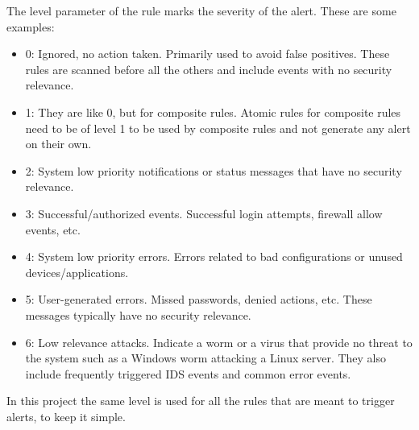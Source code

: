 \linej
The level parameter of the rule marks the severity of the alert. These are some examples\cite{libro_ossec}:
\begin{itemize}
	\item 0: Ignored, no action taken. Primarily used to avoid false positives. These rules are scanned before all the others and include events with no security relevance.
	\item 1: They are like 0, but for composite rules. Atomic rules for composite rules need to be of level 1 to be used by composite rules and not generate any alert on their own.
	\item 2: System low priority notifications or status messages that have no security relevance.
	\item 3: Successful/authorized events. Successful login attempts, firewall allow events, etc.
	\item 4: System low priority errors. Errors related to bad configurations or unused devices/applications.
	\item 5: User-generated errors. Missed passwords, denied actions, etc. These messages typically have no security relevance.
	\item 6: Low relevance attacks. Indicate a worm or a virus that provide no threat to the system such as a Windows worm attacking a Linux server. They also include frequently triggered IDS events and common error events.
\end{itemize}
In this project the same level is used for all the rules that are meant to trigger alerts, to keep it simple.

